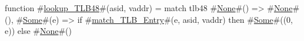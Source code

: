 function #\hyperref[sailRISCVzlookupzyTLB48]{lookup\_TLB48}#(asid, vaddr) =
  match tlb48 {
    #\hyperref[sailRISCVzNone]{None}#()  => #\hyperref[sailRISCVzNone]{None}#(),
    #\hyperref[sailRISCVzSome]{Some}#(e) => if #\hyperref[sailRISCVzmatchzyTLBzyEntry]{match\_TLB\_Entry}#(e, asid, vaddr) then #\hyperref[sailRISCVzSome]{Some}#((0, e)) else #\hyperref[sailRISCVzNone]{None}#()
  }
